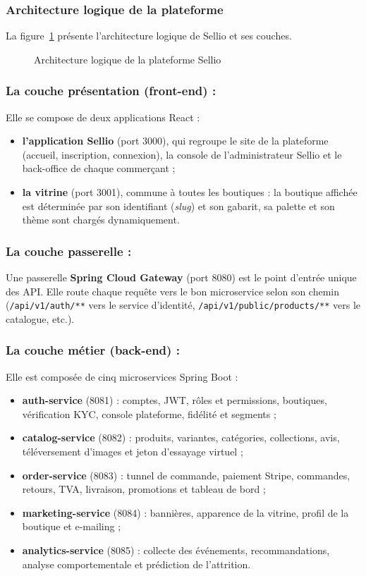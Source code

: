 \subsubsection{Architecture logique de la plateforme}
La figure~\ref{fig:archi_logique} présente l'architecture logique de Sellio et ses couches.
\begin{figure}[H]
\centering
{}
\caption{Architecture logique de la plateforme Sellio}
\label{fig:archi_logique}
\end{figure}

\subsubsection*{La couche présentation (front-end) :}
Elle se compose de deux applications React :
\begin{itemize}
  \item \textbf{l'application Sellio} (port 3000), qui regroupe le site de la plateforme (accueil, inscription, connexion), la console de l'administrateur Sellio et le back-office de chaque commerçant ;
  \item \textbf{la vitrine} (port 3001), commune à toutes les boutiques : la boutique affichée est déterminée par son identifiant (\textit{slug}) et son gabarit, sa palette et son thème sont chargés dynamiquement.
\end{itemize}

\subsubsection*{La couche passerelle :}
Une passerelle \textbf{Spring Cloud Gateway} (port 8080) est le point d'entrée unique des API. Elle route chaque requête vers le bon microservice selon son chemin (\texttt{/api/v1/auth/**} vers le service d'identité, \texttt{/api/v1/public/products/**} vers le catalogue, etc.).

\subsubsection*{La couche métier (back-end) :}
Elle est composée de cinq microservices Spring Boot :
\begin{itemize}
  \item \textbf{auth-service} (8081) : comptes, JWT, rôles et permissions, boutiques, vérification KYC, console plateforme, fidélité et segments ;
  \item \textbf{catalog-service} (8082) : produits, variantes, catégories, collections, avis, téléversement d'images et jeton d'essayage virtuel ;
  \item \textbf{order-service} (8083) : tunnel de commande, paiement Stripe, commandes, retours, TVA, livraison, promotions et tableau de bord ;
  \item \textbf{marketing-service} (8084) : bannières, apparence de la vitrine, profil de la boutique et e-mailing ;
  \item \textbf{analytics-service} (8085) : collecte des événements, recommandations, analyse comportementale et prédiction de l'attrition.
\end{itemize}

